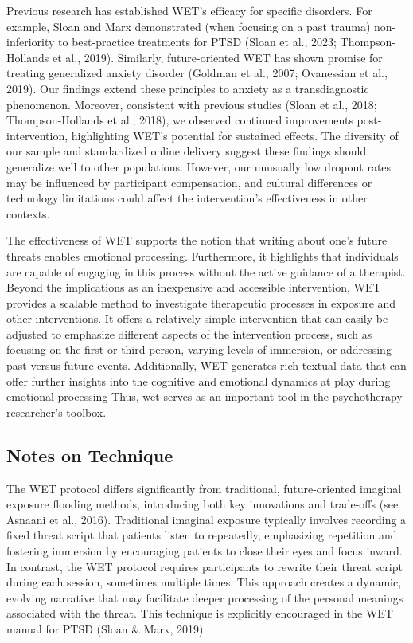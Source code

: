 \documentclass[
  man,floatsintext]{apa7}
\begin{document}
Previous research has established WET's efficacy for specific disorders.
For example, Sloan and Marx demonstrated (when focusing on a past trauma) non-inferiority to best-practice treatments for PTSD (Sloan et al., 2023; Thompson-Hollands et al., 2019).
Similarly, future-oriented WET has shown promise for treating generalized anxiety disorder (Goldman et al., 2007; Ovanessian et al., 2019).
Our findings extend these principles to anxiety as a transdiagnostic phenomenon.
Moreover, consistent with previous studies (Sloan et al., 2018; Thompson-Hollands et al., 2018), we observed continued improvements post-intervention, highlighting WET's potential for sustained effects.
The diversity of our sample and standardized online delivery suggest these findings should generalize well to other populations.
However, our unusually low dropout rates may be influenced by participant compensation, and cultural differences or technology limitations could affect the intervention's effectiveness in other contexts.

The effectiveness of WET supports the notion that writing about one's future threats enables emotional processing.
Furthermore, it highlights that individuals are capable of engaging in this process without the active guidance of a therapist.
Beyond the implications as an inexpensive and accessible intervention, WET provides a scalable method to investigate therapeutic processes in exposure and other interventions.
It offers a relatively simple intervention that can easily be adjusted to emphasize different aspects of the intervention process, such as focusing on the first or third person, varying levels of immersion, or addressing past versus future events.
Additionally, WET generates rich textual data that can offer further insights into the cognitive and emotional dynamics at play during emotional processing
Thus, wet serves as an important tool in the psychotherapy researcher's toolbox.

\subsection{Notes on Technique}\label{notes-on-technique}

The WET protocol differs significantly from traditional, future-oriented imaginal exposure flooding methods, introducing both key innovations and trade-offs (see Asnaani et al., 2016).
Traditional imaginal exposure typically involves recording a fixed threat script that patients listen to repeatedly, emphasizing repetition and fostering immersion by encouraging patients to close their eyes and focus inward.
In contrast, the WET protocol requires participants to rewrite their threat script during each session, sometimes multiple times.
This approach creates a dynamic, evolving narrative that may facilitate deeper processing of the personal meanings associated with the threat.
This technique is explicitly encouraged in the WET manual for PTSD (Sloan \& Marx, 2019).
\end{document}
